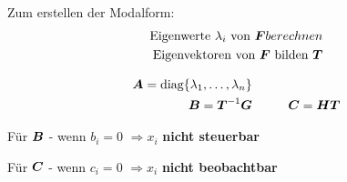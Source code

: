 \begin{tcolorbox}[colback=white!10!white,colframe=blue!70!black,title=KOCHREZEPT: Modalform]
	
	\tcblower
	Zum erstellen der Modalform:
	\begin{align}
		\text{Eigenwerte } \lambda_i \text{ von } \boldsymbol{F} berechnen\\
		\text{Eigenvektoren von } \boldsymbol{F} \text{ bilden } \boldsymbol{T}
	\end{align}
		\begin{tcolorbox}[colback=white!10!white,colframe=blue!70!black,title=Umrechnungsvorschrift in Modalform]
			\begin{align*}
			\boldsymbol{A} = \text{diag}\{\lambda_1,\dots,\lambda_n\} &
			 \\
			\boldsymbol{B} = \boldsymbol{T}^{-1}\boldsymbol{G} 
			&
			\hspace{1cm}\boldsymbol{C} = \boldsymbol{HT}
			\end{align*}
		\end{tcolorbox}

	\begin{tcolorbox}[colback=white!10!white,colframe=gray!70!black,title=Aussagen]
		Für $\boldsymbol{B}$ - wenn $b_i = 0$ $\Rightarrow x_i$ \textbf{nicht steuerbar}
		
		Für $\boldsymbol{C}$ - wenn $c_i = 0$ $\Rightarrow x_i$ \textbf{nicht beobachtbar}
		
		
		
	\end{tcolorbox}		
		
	
\end{tcolorbox}

